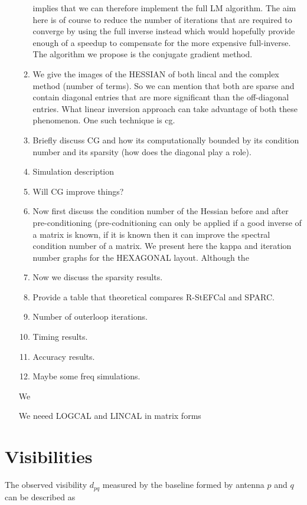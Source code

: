 \documentclass[a4paper,fleqn,usenatbib]{mnras}
\begin{document}
\begin{enumerate}
\begin{enumerate}
 implies that we can therefore implement the full LM algorithm. The aim here is of course to reduce the number of iterations that are required to converge by using the 
 full inverse instead which would hopefully provide enough of a speedup to compensate for the more expensive full-inverse. The algorithm we propose is the conjugate 
 gradient method.
 \item We give the images of the HESSIAN of both lincal and the complex method (number of terms). So we can mention that both are sparse and contain diagonal entries that 
 are more significant than the off-diagonal entries. What linear inversion approach can take advantage of both these phenomenon. One such technique is 
 cg. 
 \item Briefly discuss CG and how its computationally bounded by its condition number and its sparsity (how does the diagonal play a role).
 \item Simulation description
 \item Will CG improve things?
 \item Now first discuss the condition
 number of the Hessian before and after pre-conditioning (pre-codnitioning can only be applied if a good inverse of a matrix is known, if it is known then it can improve 
 the spectral condition number of a matrix. We present here the kappa and iteration number graphs for the HEXAGONAL layout. Although the
 \item Now we discuss the sparsity results. 
 \item Provide a table that theoretical compares R-StEFCal and SPARC.
 \item Number of outerloop iterations. 
 \item Timing results.
 \item Accuracy results.
 \item Maybe some freq simulations.
 \end{enumerate}
 
 We
 
 We neeed LOGCAL and LINCAL in matrix forms
 
 
 
\end{enumerate} 


\section{Visibilities}
The observed visibility $d_{pq}$ measured by the baseline formed by antenna $p$ and $q$ can be described as
\end{document}
